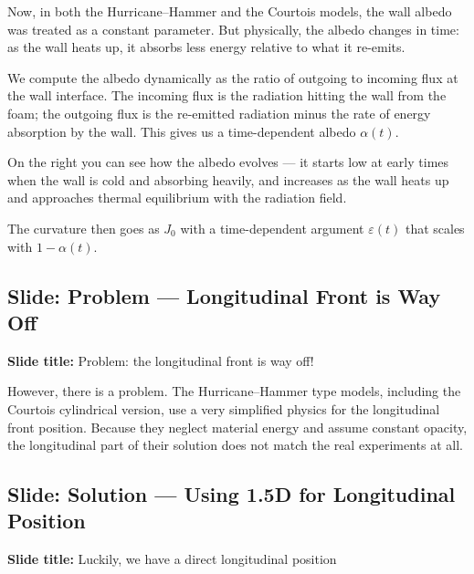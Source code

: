 \documentclass[12pt, a4paper]{article}
\begin{document}
Now, in both the Hurricane--Hammer and the Courtois models, the wall albedo was treated as a constant parameter. But physically, the albedo changes in time: as the wall heats up, it absorbs less energy relative to what it re-emits.

We compute the albedo dynamically as the ratio of outgoing to incoming flux at the wall interface. The incoming flux is the radiation hitting the wall from the foam; the outgoing flux is the re-emitted radiation minus the rate of energy absorption by the wall. This gives us a time-dependent albedo $\alpha(t)$.

On the right you can see how the albedo evolves --- it starts low at early times when the wall is cold and absorbing heavily, and increases as the wall heats up and approaches thermal equilibrium with the radiation field.

The curvature then goes as $J_0$ with a time-dependent argument $\varepsilon(t)$ that scales with $1 - \alpha(t)$.

\subsection{Slide: Problem --- Longitudinal Front is Way Off}

\begin{slidebox}
\textbf{Slide title:} Problem: the longitudinal front is way off!
\end{slidebox}

However, there is a problem. The Hurricane--Hammer type models, including the Courtois cylindrical version, use a very simplified physics for the longitudinal front position. Because they neglect material energy and assume constant opacity, the longitudinal part of their solution does not match the real experiments at all.

\subsection{Slide: Solution --- Using 1.5D for Longitudinal Position}

\begin{slidebox}
\textbf{Slide title:} Luckily, we have a direct longitudinal position
\end{slidebox}
\end{document}
